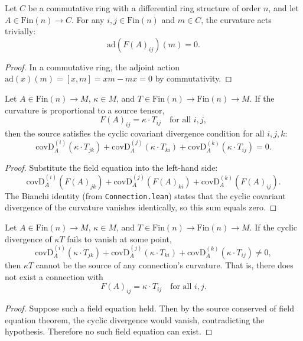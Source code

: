 \begin{theorem}
Let $C$ be a commutative ring with a differential ring structure of order $n$, and let $A \in \text{Fin}(n) \to C$. For any $i, j \in \text{Fin}(n)$ and $m \in C$, the curvature acts trivially:
\[
\text{ad}(F(A)_{ij})(m) = 0.
\]
\begin{proof}
In a commutative ring, the adjoint action $\text{ad}(x)(m) = [x, m] = xm - mx = 0$ by commutativity.
\end{proof}
\end{theorem}

\begin{theorem}
Let $A \in \text{Fin}(n) \to M$, $\kappa \in M$, and $T \in \text{Fin}(n) \to \text{Fin}(n) \to M$. If the curvature is proportional to a source tensor,
\[
F(A)_{ij} = \kappa \cdot T_{ij} \quad \text{for all } i, j,
\]
then the source satisfies the cyclic covariant divergence condition for all $i, j, k$:
\[
\text{covD}_A^{(i)}(\kappa \cdot T_{jk}) + \text{covD}_A^{(j)}(\kappa \cdot T_{ki}) + \text{covD}_A^{(k)}(\kappa \cdot T_{ij}) = 0.
\]
\begin{proof}
Substitute the field equation into the left-hand side:
\[
\text{covD}_A^{(i)}(F(A)_{jk}) + \text{covD}_A^{(j)}(F(A)_{ki}) + \text{covD}_A^{(k)}(F(A)_{ij}).
\]
The Bianchi identity (from \texttt{Connection.lean}) states that the cyclic covariant divergence of the curvature vanishes identically, so this sum equals zero.
\end{proof}
\end{theorem}

\begin{theorem}
Let $A \in \text{Fin}(n) \to M$, $\kappa \in M$, and $T \in \text{Fin}(n) \to \text{Fin}(n) \to M$. If the cyclic divergence of $\kappa T$ fails to vanish at some point,
\[
\text{covD}_A^{(i)}(\kappa \cdot T_{jk}) + \text{covD}_A^{(j)}(\kappa \cdot T_{ki}) + \text{covD}_A^{(k)}(\kappa \cdot T_{ij}) \neq 0,
\]
then $\kappa T$ cannot be the source of any connection's curvature. That is, there does not exist a connection with
\[
F(A)_{ij} = \kappa \cdot T_{ij} \quad \text{for all } i, j.
\]
\begin{proof}
Suppose such a field equation held. Then by the source conserved of field equation theorem, the cyclic divergence would vanish, contradicting the hypothesis. Therefore no such field equation can exist.
\end{proof}
\end{theorem}

